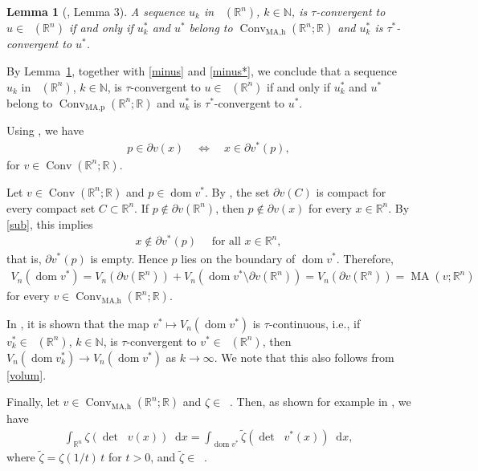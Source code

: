 \documentclass[11pt]{article}
\newtheorem{lema}[teo]{Lemma}
\theoremstyle{definition} %
\newcommand{\dif}{\mathop{}\!\mathrm{d}}
\newcommand{\RR}{(\mathbb{R}^n)}
\DeclareMathOperator{\Conv}{Conv}
\DeclareMathOperator{\dom}{dom}
\DeclareMathOperator{\MA}{MA}
\DeclareMathOperator{\MAh}{MA,h}
\DeclareMathOperator{\MAp}{MA,p}
\DeclareMathOperator{\D}{D^2}
\DeclareMathOperator{\LC}{Conv_{ld}}
\DeclareMathOperator{\LP}{Conv_{lp}}
\newcommand{\finite}{(\mathbb{R}^n; \mathbb{R})}
\DeclareMathOperator{\conc}{Conc([0,\infty))}
\begin{document}
\begin{lema}[\cite{baetaludwigsemicontinuity}, Lemma 3]\label{duality}
A sequence $u_k$ in $\LC\RR$, $k\in\mathbb{N}$, is $\tau$-convergent to $u \in \LC\RR$ if and only if $u_k^*$ and $u^*$ belong to 
$\Conv_{\MAh}\finite$ and $u_k^*$ is $\tau^*$-convergent to  $u^*$.
\end{lema}

By Lemma~\ref{duality}, together with \eqref{minus} and \eqref{minus*}, we  conclude that a sequence $u_k$ 
in $\LP\RR$, $k\in\mathbb{N}$,
is $\tau$-convergent to $u \in \LP\RR$ if and only if $u_k^*$ and $u^*$ belong to 
$\Conv_{\MAp}\finite$ and $u_k^*$ is $\tau^*$-convergent to  $u^*$.





Using \cite[Corollary 23.5.1]{rockafellar1997convex}, we have  
\begin{align}\label{sub}
    p\in \partial v(x) \quad  \Leftrightarrow \quad x \in \partial v^*(p),
\end{align}
for $v\in \Conv\finite$. 




Let  $v\in \Conv\finite$ and $p\in\dom v^*$. By \cite[Lemma A.22]{figalli2017monge}, the set $\partial v(C)$ is compact for every  compact set $C\subset \mathbb{R}^n$. If $p\notin \partial v(\mathbb{R}^n)$, then $p\not\in\partial v(x)$ for every $x\in\mathbb{R}^n$. By \eqref{sub},  this implies 
\begin{align*}
    x\not\in \partial v^*(p) \quad \mbox{ for all }  x\in\mathbb{R}^n,
\end{align*}
that is, $\partial v^*(p)$ is empty. Hence $p$ lies on the boundary of $\dom v^*$. Therefore, 
\begin{align}\label{volum}
    V_n(\dom v^*)= V_n(\partial v(\mathbb{R}^n))+V_n(\dom v^*\setminus \partial v(\mathbb{R}^n)) = V_n(\partial v(\mathbb{R}^n))=\MA(v;\mathbb{R}^n)
\end{align}
for every $v\in \Conv_{\MAh}\finite$. 



In \cite[Lemma 9]{baeta1d}, it is shown that the map $v^*\mapsto V_n(\dom v^*)$ is $\tau$-continuous, i.e., if $v_k^*\in \LC(\mathbb{R}^n)$, $k\in\mathbb{N}$, is $\tau$-convergent to $v^*\in \LC(\mathbb{R}^n)$, then $V_n(\dom v_k^*)\to V_n(\dom v^*)$ as $k\to\infty$. We note that this also follows from \eqref{volum}.




Finally, let $v\in\Conv_{\MAh}\finite$ and $\zeta \in\conc$. Then, as shown for example in \cite[equation~(11)]{baetaludwigsemicontinuity}, we have
\begin{align}\label{conjugate}
  \int_{\mathbb{R}^n} \zeta (\det \D v(x))\dif x  =\int_{\dom v^*} \tilde{\zeta} (\det \D v^*(x))\dif x,   
\end{align}
where $\tilde{\zeta}= \zeta(1/t)\,t$ for $t>0$, and $\tilde{\zeta}\in\conc$. 
\medskip
\end{document}

